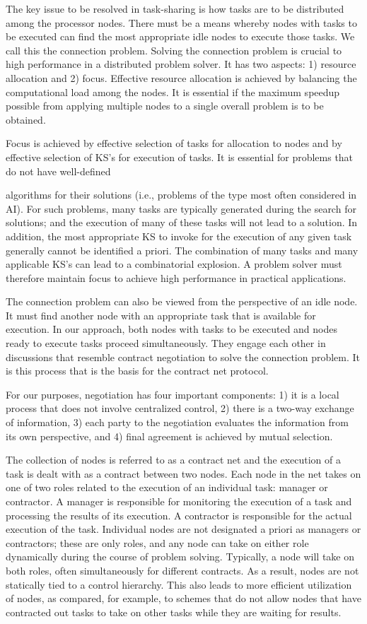 \documentclass[
]{article}
\begin{document}
The key issue to be resolved in task-sharing is how tasks are to be
distributed among the processor nodes. There must be a means whereby
nodes with tasks to be executed can find the most appropriate idle nodes
to execute those tasks. We call this the connection problem. Solving the
connection problem is crucial to high performance in a distributed
problem solver. It has two aspects: 1) resource allocation and 2) focus.
Effective resource allocation is achieved by balancing the computational
load among the nodes. It is essential if the maximum speedup possible
from applying multiple nodes to a single overall problem is to be
obtained.

Focus is achieved by effective selection of tasks for allocation to
nodes and by effective selection of KS's for execution of tasks. It is
essential for problems that do not have well-defined

algorithms for their solutions (i.e., problems of the type most often
considered in AI). For such problems, many tasks are typically generated
during the search for solutions; and the execution of many of these
tasks will not lead to a solution. In addition, the most appropriate KS
to invoke for the execution of any given task generally cannot be
identified a priori. The combination of many tasks and many applicable
KS's can lead to a combinatorial explosion. A problem solver must
therefore maintain focus to achieve high performance in practical
applications.

The connection problem can also be viewed from the perspective of an
idle node. It must find another node with an appropriate task that is
available for execution. In our approach, both nodes with tasks to be
executed and nodes ready to execute tasks proceed simultaneously. They
engage each other in discussions that resemble contract negotiation to
solve the connection problem. It is this process that is the basis for
the contract net protocol.

For our purposes, negotiation has four important components: 1) it is a
local process that does not involve centralized control, 2) there is a
two-way exchange of information, 3) each party to the negotiation
evaluates the information from its own perspective, and 4) final
agreement is achieved by mutual selection.

The collection of nodes is referred to as a contract net and the
execution of a task is dealt with as a contract between two nodes. Each
node in the net takes on one of two roles related to the execution of an
individual task: manager or contractor. A manager is responsible for
monitoring the execution of a task and processing the results of its
execution. A contractor is responsible for the actual execution of the
task. Individual nodes are not designated a priori as managers or
contractors; these are only roles, and any node can take on either role
dynamically during the course of problem solving. Typically, a node will
take on both roles, often simultaneously for different contracts. As a
result, nodes are not statically tied to a control hierarchy. This also
leads to more efficient utilization of nodes, as compared, for example,
to schemes that do not allow nodes that have contracted out tasks to
take on other tasks while they are waiting for results.
\end{document}

